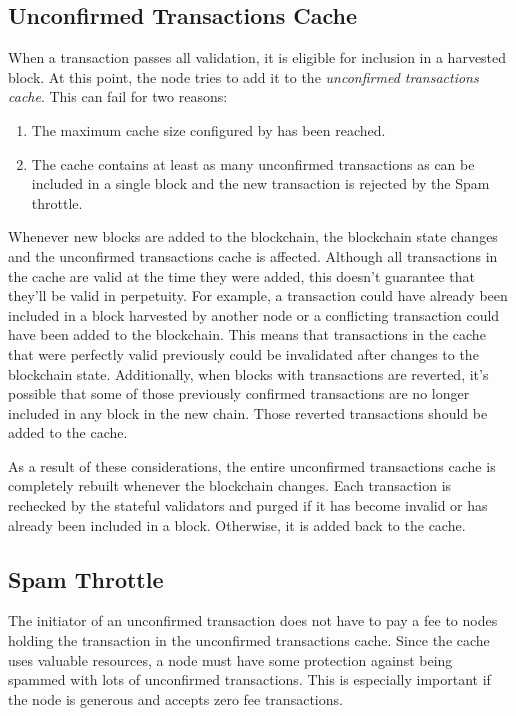 \subsection{Unconfirmed Transactions Cache}

When a transaction passes all validation, it is eligible for inclusion in a harvested block.
At this point, the node tries to add it to the \emph{unconfirmed transactions cache}.
This can fail for two reasons:
\begin{enumerate}
	\item{The maximum cache size configured by  has been reached.}
	\item{The cache contains at least as many unconfirmed transactions as can be included in a single block and the new transaction is rejected by the Spam throttle.}
\end{enumerate}

Whenever new blocks are added to the blockchain, the blockchain state changes and the unconfirmed transactions cache is affected.
Although all transactions in the cache are valid at the time they were added, this doesn't guarantee that they'll be valid in perpetuity.
For example, a transaction could have already been included in a block harvested by another node or a conflicting transaction could have been added to the blockchain.
This means that transactions in the cache that were perfectly valid previously could be invalidated after changes to the blockchain state.
Additionally, when blocks with transactions are reverted, it's possible that some of those previously confirmed transactions are no longer included in any block in the new chain.
Those reverted transactions should be added to the cache.

As a result of these considerations, the entire unconfirmed transactions cache is completely rebuilt whenever the blockchain changes.
Each transaction is rechecked by the stateful validators and purged if it has become invalid or has already been included in a block.
Otherwise, it is added back to the cache.

\subsection{Spam Throttle}

The initiator of an unconfirmed transaction does not have to pay a fee to nodes holding the transaction in the unconfirmed transactions cache.
Since the cache uses valuable resources, a node must have some protection against being spammed with lots of unconfirmed transactions.
This is especially important if the node is generous and accepts zero fee transactions.

